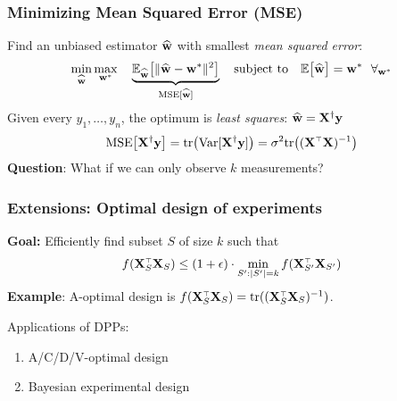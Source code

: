 \documentclass{beamer}
\begin{document}
\begin{frame}
  \frametitle{Minimizing Mean Squared Error (MSE)}
  Find an unbiased estimator $\widehat{\mathbf w}$ with smallest
  \textit{mean squared error}:
  \begin{align*}
    \min_{\widehat{\mathbf w}}\max_{\mathbf w^*}\quad
    \underbrace{\mathbb E_{\widehat{\mathbf w}}\big[\|\widehat{\mathbf w}-\mathbf w^*\|^2\big]}_{\mathrm{MSE}[\widehat{\mathbf w}]}\quad\text{subject
    to}\quad\mathbb E\big[\widehat{\mathbf w}\big]=\mathbf w^*\ \ \forall_{\mathbf w^*}
  \end{align*}
  \pause
Given every $y_1,\dots,y_n$, the optimum is \textit{least squares}: $\widehat{\mathbf w}=\mathbf X^\dagger\mathbf y$
  \begin{align*}
\MSE{\X^\dagger\y}=\tr\big(\Var[\X^\dagger\y]\big)=\sigma^2\tr\big((\X^\top\X)^{-1}\big)
  \end{align*}
  \vspace{5mm}
  \pause
  \textbf{Question}: What if we can only observe $k$ measurements?
  \pause
  
\begin{center}\end{center}
\end{frame}

\begin{frame}
  \frametitle{Extensions: Optimal design of experiments}
  \textbf{Goal:} Efficiently find subset $S$ of size $k$ such that
\begin{align*}
f(\X_S^\top\X_S)\leq (1+\epsilon)\cdot\min_{S':|S'|=k}f(\X_{S'}^\top\X_{S'})
\end{align*}
\pause
\textbf{Example}: A-optimal design is $f(\X_S^\top\X_S) =
\tr((\X_S^\top\X_S)^{-1})$.
\pause
\vspace{5mm}

Applications of DPPs:
\begin{enumerate}
\item A/C/D/V-optimal design
  \cite{tractable-experimental-design,proportional-volume-sampling,bayesian-experimental-design}
  \pause
\item Bayesian experimental design \cite{bayesian-experimental-design}
\end{enumerate}

\end{frame}
\end{document}
